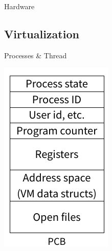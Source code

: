 \documentclass[10pt]{beamer}
\begin{document}
\begin{frame}[allowframebreaks]{Hardware}
\begin{center}
    \end{center}
\end{frame}

\subsection{Virtualization}
\begin{frame}[allowframebreaks]{Processes \& Thread}
 \begin{center}
    \includegraphics[keepaspectratio, width=\textwidth, height=\textheight-2\baselineskip-2\baselineskip]{img/010_pcb.png} \\ \framebreak

\end{center}
\end{frame}
\end{document}
